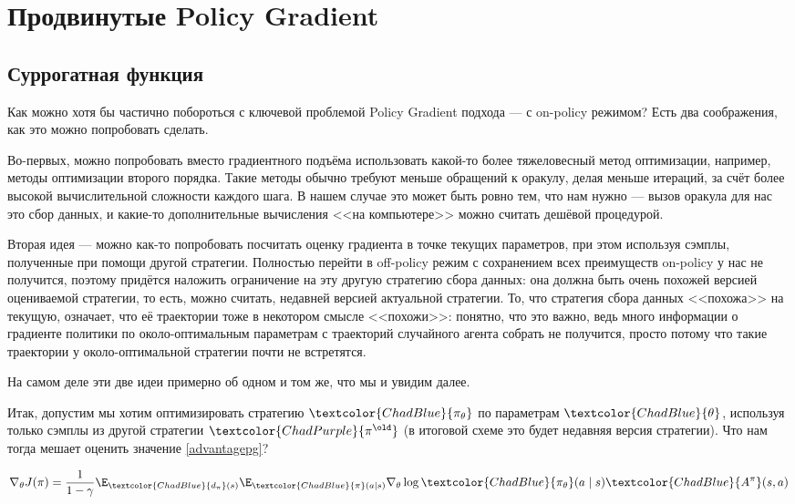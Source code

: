 \section{Продвинутые Policy Gradient}\label{TRPOPPOsection}

\subsection{Суррогатная функция}

Как можно хотя бы частично побороться с ключевой проблемой Policy Gradient подхода --- с on-policy режимом? Есть два соображения, как это можно попробовать сделать.

Во-первых, можно попробовать вместо градиентного подъёма использовать какой-то более тяжеловесный метод оптимизации, например, методы оптимизации второго порядка. Такие методы обычно требуют меньше обращений к оракулу, делая меньше итераций, за счёт более высокой вычислительной сложности каждого шага. В нашем случае это может быть ровно тем, что нам нужно --- вызов оракула для нас это сбор данных, и какие-то дополнительные вычисления <<на компьютере>> можно считать дешёвой процедурой. 

Вторая идея --- можно как-то попробовать посчитать оценку градиента в точке текущих параметров, при этом используя сэмплы, полученные при помощи другой стратегии. Полностью перейти в off-policy режим с сохранением всех преимуществ on-policy у нас не получится, поэтому придётся наложить ограничение на эту другую стратегию сбора данных: она должна быть очень похожей версией оцениваемой стратегии, то есть, можно считать, недавней версией актуальной стратегии. То, что стратегия сбора данных <<похожа>> на текущую, означает, что её траектории тоже в некотором смысле <<похожи>>: понятно, что это важно, ведь много информации о градиенте политики по около-оптимальным параметрам с траекторий случайного агента собрать не получится, просто потому что такие траектории у около-оптимальной стратегии почти не встретятся.

На самом деле эти две идеи примерно об одном и том же, что мы и увидим далее.

Итак, допустим мы хотим оптимизировать стратегию $\textcolor{ChadBlue}{\pi_\theta}$ по параметрам $\textcolor{ChadBlue}{\theta}$, используя только сэмплы из другой стратегии $\textcolor{ChadPurple}{\pi^{\old}}$ (в итоговой схеме это будет недавняя версия стратегии). Что нам тогда мешает оценить значение \eqref{advantagepg}?

$$
\nabla_{\theta} J(\pi) = \frac{1}{1 - \gamma}\E_{\textcolor{ChadBlue}{d_\pi}(s)} \E_{\textcolor{ChadBlue}{\pi}(a \mid s)} \nabla_{\theta} \log \textcolor{ChadBlue}{\pi_\theta} (a \mid s) \textcolor{ChadBlue}{A^{\pi}}(s, a)
$$

